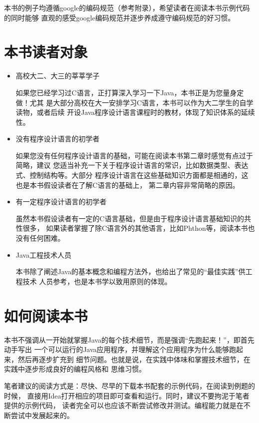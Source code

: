 本书的例子均遵循google的编码规范（参考附录），希望读者在阅读本书示例代码的同时能够
直观的感受google编码规范并逐步养成遵守编码规范的好习惯。

\section*{本书读者对象}
\begin{itemize}
    \item 高校大二、大三的莘莘学子

        如果您已经学习过C语言，正打算深入学习一下Java，本书正是为您量身定做！尤其
        是大部分高校在大一安排学习C语言，本书可以作为大二学生的自学读物，或者后续
        开设Java程序设计语言课程时的教材，体现了知识体系的延续性。
    \item 没有程序设计语言的初学者
        
        如果您没有任何程序设计语言的基础，可能在阅读本书第二章时感觉有点过于简略，建议
        您适当补充一下关于程序设计语言的常识，比如数据类型、表达式、控制结构等。大部分
        程序设计语言在这些基础知识方面都是相通的，这也是本书假设读者在了解C语言的基础上，
        第二章内容非常简略的原因。
    \item 有一定程序设计语言的初学者
        
        虽然本书假设读者有一定的C语言基础，但是由于程序设计语言基础知识的共性很多，
        如果读者掌握了除C语言外的其他语言，比如Phthon等，阅读本书也没有任何困难。
    \item Java工程技术人员
        
        本书除了阐述Java的基本概念和编程方法外，也给出了常见的“最佳实践”供工程技术
        人员参考，也是本书学以致用原则的体现。
\end{itemize}

\section*{如何阅读本书}

本书不强调从一开始就掌握Java的每个技术细节，而是强调“先跑起来！”，即首先动手写出
一个可以运行的Java应用程序，并理解这个应用程序为什么能够跑起来，然后再逐步扩充到
细节问题。也就是说，在实践中体味和掌握技术细节，在实践中逐步形成良好的编程风格和
思维习惯。

笔者建议的阅读方式是：尽快、尽早的下载本书配套的示例代码，在阅读到例题的时候，
直接用Idea打开相应的项目即可查看和运行。同时，建议不要拘泥于笔者提供的示例代码，
读者完全可以也应该不断尝试修改并测试。编程能力就是在不断尝试中发展起来的。

